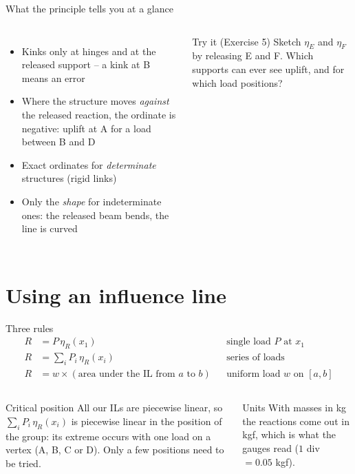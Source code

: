 \documentclass[aspectratio=169,11pt]{beamer}
\newcommand{\il}[1]{\eta_{#1}}
\begin{document}
\begin{frame}{What the principle tells you at a glance}
\begin{columns}[T]
\begin{itemize}
  \item Kinks only at hinges and at the released support -- a kink at B means an error
  \item Where the structure moves \emph{against} the released reaction, the ordinate is negative: uplift at A for a load between B and D
  \item Exact ordinates for \emph{determinate} structures (rigid links)
  \item Only the \emph{shape} for indeterminate ones: the released beam bends, the line is curved
\end{itemize}
\begin{exampleblock}{Try it (Exercise 5)}
Sketch $\il{E}$ and $\il{F}$ by releasing E and F. Which supports can ever see uplift, and for which load positions?
\end{exampleblock}
\end{columns}
\end{frame}

\section{Using an influence line}
\begin{frame}{Three rules}
\begin{align*}
  R &= P\,\il{R}(x_1) && \text{single load $P$ at $x_1$}\\
  R &= \textstyle\sum_i P_i\,\il{R}(x_i) && \text{series of loads}\\
  R &= w \times (\text{area under the IL from $a$ to $b$}) && \text{uniform load $w$ on $[a,b]$}
\end{align*}
\begin{columns}[T]
\begin{block}{Critical position}
All our ILs are piecewise linear, so $\sum_i P_i\,\il{R}(x_i)$ is piecewise linear in the position of the group: its extreme occurs with \alert{one load on a vertex} (A, B, C or D). Only a few positions need to be tried.
\end{block}
\begin{block}{Units}
With masses in kg the reactions come out in kgf, which is what the gauges read ($1$ div $= 0.05$ kgf).
\end{block}
\end{columns}
\end{frame}
\end{document}
